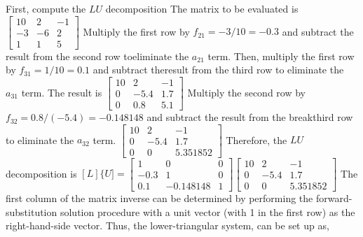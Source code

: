 \documentclass[../main.tex]{subfiles}
\begin{document}
\chapter{}
\label{cha:cha_10}


\section{}


First, compute the $L U$ decomposition The matrix to be evaluated is
\bigbreak
$\left[\begin{array}{ccc}
10 & 2 & -1 \\
-3 & -6 & 2 \\
1 & 1 & 5
\end{array}\right]$
\bigbreak
Multiply the first row by $f_{21}=-3 / 10=-0.3$ and subtract the result from the second row to\smallbreak eliminate the $a_{21}$ term. Then, multiply the first row by $f_{31}=1 / 10=0.1$ and subtract the\smallbreak result from the third row to eliminate the $a_{31}$ term. The result is
\bigbreak
$\left[\begin{array}{ccc}
10 & 2 & -1 \\
0 & -5.4 & 1.7 \\
0 & 0.8 & 5.1
\end{array}\right]$
\bigbreak
Multiply the second row by $f_{32}=0.8 /(-5.4)=-0.148148$ and subtract the result from the break\smallbreak third row to eliminate the $a_{32}$ term.
\bigbreak
$\left[\begin{array}{ccc}
10 & 2 & -1 \\
0 & -5.4 & 1.7 \\
0 & 0 & 5.351852
\end{array}\right]$
\bigbreak
Therefore, the $L U$ decomposition is
\bigbreak
$[L]\{U]=\left[\begin{array}{ccc}
1 & 0 & 0 \\
-0.3 & 1 & 0 \\
0.1 & -0.148148 & 1
\end{array}\right]\left[\begin{array}{ccc}
10 & 2 & -1 \\
0 & -5.4 & 1.7 \\
0 & 0 & 5.351852
\end{array}\right]$
\bigbreak
The first column of the matrix inverse can be determined by performing the forward-\smallbreak substitution solution procedure with a unit vector (with 1 in the first row) as the right-hand-\smallbreak side vector. Thus, the lower-triangular system, can be set up as,
\end{document}
